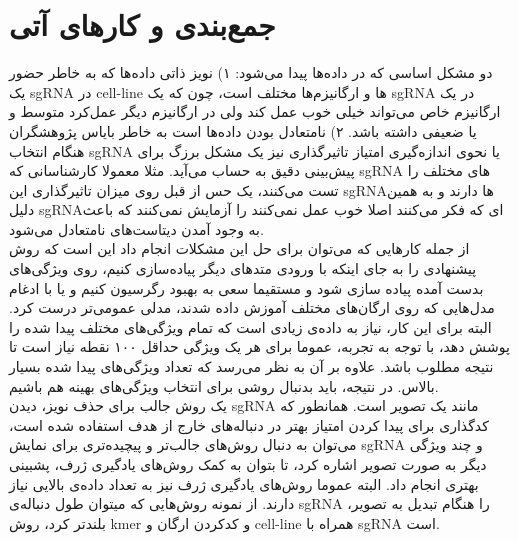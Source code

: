 \documentclass[12pt,a4paper,BCOR=.7cm,headsepline,bibliography=totoc]{report}
\begin{document}
\chapter{جمع‌بندی و کار‌های آتی}
دو مشکل اساسی که در داده‌ها پیدا می‌شود: ۱) نویز ذاتی داده‌ها که به خاطر حضور یک sgRNA در cell-line ها و ارگانیزم‌ها مختلف است، چون که یک sgRNA در یک ارگانیزم خاص می‌تواند خیلی خوب عمل کند ولی در ارگانیزم دیگر عمل‌کرد متوسط و یا ضعیفی داشته باشد.  ۲) نامتعادل بودن داده‌ها است به خاطر بایاس پژوهشگران هنگام انتخاب sgRNA یا نحوی اندازه‌گیری امتیاز تاثیرگذاری نیز یک مشکل برزگ برای پیش‌بینی دقیق به حساب می‌آید. مثلا معمولا کارشناسانی که sgRNA های مختلف را تست می‌کنند، یک حس از قبل روی میزان تاثیرگذاری این sgRNAها دارند و به همین دلیل sgRNAای که فکر می‌کنند اصلا خوب عمل نمی‌کنند را آزمایش نمی‌کنند که باعث به وجود آمدن دیتاست‌های نامتعادل می‌شود.\\
  از جمله کار‌هایی که می‌توان برای حل این مشکلات انجام داد این است که روش پیشنهادی را به جای اینکه با ورودی متد‌های دیگر پیاده‌سازی کنیم، روی ویژگی‌های بدست آمده پیاده سازی شود و مستقیما سعی به بهبود رگرسیون کنیم و یا با ادغام مدل‌هایی که روی ارگان‌های مختلف آموزش داده شدند، مدلی عمومی‌تر درست کرد. البته برای این کار، نیاز به داده‌ی زیادی است که تمام ویژگی‌های مختلف پیدا شده را پوشش دهد، با توجه به تجربه، عموما برای هر یک ویژگی حداقل ۱۰۰ نقطه نیاز است تا نتیجه مطلوب باشد. علاوه بر آن به نظر می‌رسد که تعداد ویژگی‌های پیدا شده بسیار بالاس. در نتیجه، باید بدنبال روشی برای انتخاب ویژگی‌های بهینه هم باشیم. \\
یک روش جالب برای حذف نویز، دیدن sgRNA مانند یک تصویر است. همانطور که کدگذاری  برای پیدا کردن امتیاز بهتر در دنباله‌های خارج از هدف استفاده شده است، می‌توان به دنبال روش‌های جالب‌تر و پیچیده‌تری برای نمایش sgRNA و چند ویژگی دیگر به صورت تصویر اشاره کرد، تا بتوان به کمک روش‌های یادگیری ژرف، پشبینی بهتری انجام داد. البته عموما روش‌های یادگیری ژرف نیز به تعداد داده‌ی بالایی نیاز دارند. از نمونه روش‌هایی که میتوان طول دنباله‌ی sgRNA را هنگام تبدیل به تصویر، بلندتر کرد، روش kmer و کدکردن ارگان و cell-line همراه با sgRNA است.
\end{document}

